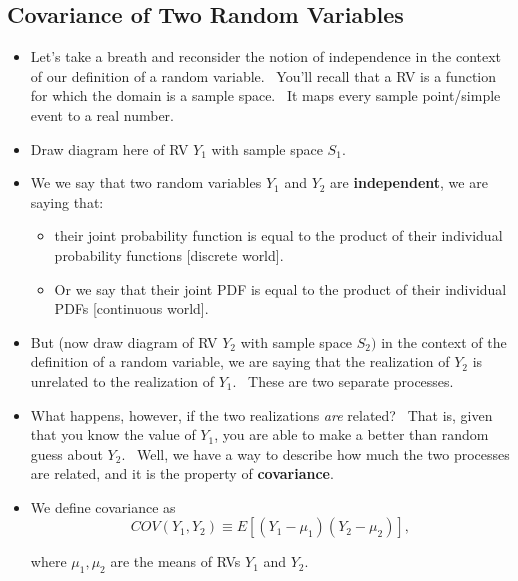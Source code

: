 \documentclass[11pt]{article}
\begin{document}
\subsection{Covariance of Two Random Variables}

\begin{itemize}
\item Let's take a breath and reconsider the notion of independence in the
context of our definition of a random variable. \ You'll recall that a RV is
a function for which the domain is a sample space. \ It maps every sample
point/simple event to a real number. \ 

\item Draw diagram here of RV $Y_{1}$ with sample space $S_{1}$.

\item We we say that two random variables $Y_{1}$ and $Y_{2}$ are \textbf{%
independent}, we are saying that:

\begin{itemize}
\item their joint probability function is equal to the product of their
individual probability functions [discrete world].

\item Or we say that their joint PDF is equal to the product of their
individual PDFs [continuous world].
\end{itemize}

\item But (now draw diagram of RV $Y_{2}$ with sample space $S_{2})$ in the
context of the definition of a random variable, we are saying that the
realization of $Y_{2}$ is unrelated to the realization of $Y_{1}$. \ These
are two separate processes. \ 

\item What happens, however, if the two realizations \textit{are }related? \
That is, given that you know the value of $Y_{1}$, you are able to make a
better than random guess about $Y_{2}$. \ Well, we have a way to describe
how much the two processes are related, and it is the property of \textbf{%
covariance}.

\item We define covariance as%
\begin{equation*}
COV(Y_{1},Y_{2})\equiv E[(Y_{1}-\mu _{1})(Y_{2}-\mu _{2})],
\end{equation*}

where $\mu _{1},\mu _{2}$ are the means of RVs $Y_{1}$ and $Y_{2}$.


\end{itemize}
\end{document}
